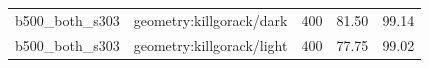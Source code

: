 \begin{longtable}{l>{\raggedright\arraybackslash}p{.42\linewidth}rrr}
b500\_\allowbreak{}both\_\allowbreak{}s303 & %
geometry:killgorack/dark & %
400 & %
81.50 & %
99.14 \\ %

b500\_\allowbreak{}both\_\allowbreak{}s303 & %
geometry:killgorack/light & %
400 & %
77.75 & %
99.02 \\ %


\end{longtable}
